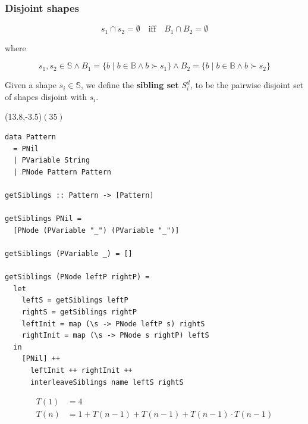 \begin{frame}
\begin{columns}
\end{columns}

\end{frame}

\begin{frame}

\frametitle{Disjoint shapes}

\begin{center}

$$s_1\cap s_2=\emptyset\quad\text{iff}\quad B_1\cap B_2=\emptyset$$

where

$$s_1,s_2\in\mathbb{S} \wedge B_1=\{b\mid b\in\mathbb{B} \wedge b\succ
s_1\}\wedge B_2=\{b\mid b\in\mathbb{B} \wedge b\succ s_2\}$$

\end{center}

\end{frame}


\begin{frame}

\begin{center}

Given a shape $s_i\in\mathbb{S}$, we define the {\bf sibling set} $S^d_i$, to
be the pairwise disjoint set of shapes disjoint with $s_i$.

\end{center}

\end{frame}

\begin{frame}[fragile]

\begin{textblock}{1}(13.8,-3.5)$(35)$\end{textblock}

\begin{lstlisting}
data Pattern
  = PNil
  | PVariable String
  | PNode Pattern Pattern

getSiblings :: Pattern -> [Pattern]

getSiblings PNil =
  [PNode (PVariable "_") (PVariable "_")]

getSiblings (PVariable _) = []

getSiblings (PNode leftP rightP) =
  let
    leftS = getSiblings leftP
    rightS = getSiblings rightP
    leftInit = map (\s -> PNode leftP s) rightS
    rightInit = map (\s -> PNode s rightP) leftS
  in
    [PNil] ++
      leftInit ++ rightInit ++
      interleaveSiblings name leftS rightS
\end{lstlisting}

\end{frame}

\begin{frame}

\begin{align*}
T(1)&=4\\
T(n)&=1+T(n-1)+T(n-1)+T(n-1)\cdot T(n-1)
\end{align*}

\end{frame}
